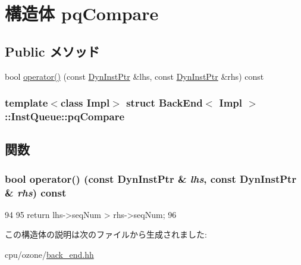 \hypertarget{structBackEnd_1_1InstQueue_1_1pqCompare}{
\section{構造体 pqCompare}
\label{structBackEnd_1_1InstQueue_1_1pqCompare}
}
\subsection*{Public メソッド}
\begin{DoxyCompactItemize}
\item 
bool \hyperlink{structBackEnd_1_1InstQueue_1_1pqCompare_aa171c804e811b84fcefef511a9031fb6}{operator()} (const \hyperlink{classBackEnd_a028ce10889c5f6450239d9e9a7347976}{DynInstPtr} \&lhs, const \hyperlink{classBackEnd_a028ce10889c5f6450239d9e9a7347976}{DynInstPtr} \&rhs) const 
\end{DoxyCompactItemize}
\subsubsection*{template$<$class Impl$>$ struct BackEnd$<$ Impl $>$::InstQueue::pqCompare}



\subsection{関数}
\hypertarget{structBackEnd_1_1InstQueue_1_1pqCompare_aa171c804e811b84fcefef511a9031fb6}{
\subsubsection[{operator()}]{\setlength{\rightskip}{0pt plus 5cm}bool operator() (const {\bf DynInstPtr} \& {\em lhs}, \/  const {\bf DynInstPtr} \& {\em rhs}) const}}
\label{structBackEnd_1_1InstQueue_1_1pqCompare_aa171c804e811b84fcefef511a9031fb6}



\begin{DoxyCode}
94             {
95                 return lhs->seqNum > rhs->seqNum;
96             }
\end{DoxyCode}


この構造体の説明は次のファイルから生成されました:\begin{DoxyCompactItemize}
\item 
cpu/ozone/\hyperlink{back__end_8hh}{back\_\-end.hh}\end{DoxyCompactItemize}
